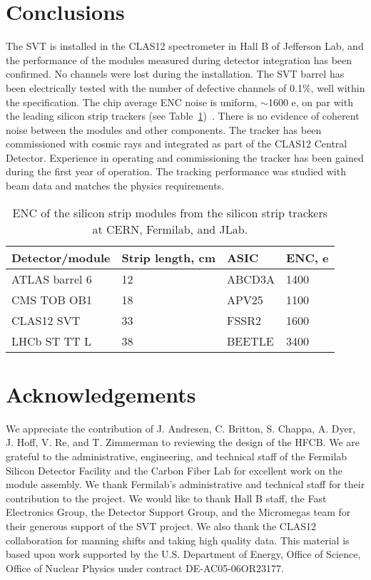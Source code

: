 \section{Conclusions}

The SVT is installed in the CLAS12 spectrometer in Hall B of Jefferson Lab, and the performance of the modules measured during detector integration has been confirmed. No channels were lost during the installation. The SVT barrel has been electrically  tested with the number of defective channels of 0.1$\%$, well within the specification. The chip average ENC noise is uniform, $\sim$1600 e, on par with the leading silicon strip trackers (see Table~\ref{tab:enc-table})~\cite{CMSCOSMICNOTE, ATLASSCT, LHCBTT}. There is no evidence of coherent noise between the modules and other components. The tracker has been commissioned with cosmic rays and integrated as part of the CLAS12 Central Detector. Experience in operating and commissioning the tracker has been gained during the first year of operation. The tracking performance was studied with beam data and matches the physics requirements. 

\begin{table}[hbt]
\begin{tabular}{llll}
\hline
Detector/module      & Strip length, cm & ASIC & ENC, e\\ \hline
ATLAS barrel 6        & 12  & ABCD3A    & 1400  \\
CMS TOB OB1        & 18  & APV25       & 1100  \\
CLAS12 SVT           & 33  & FSSR2       & 1600 \\
LHCb ST TT L         & 38  & BEETLE     & 3400  \\ \hline
\end{tabular}
\caption{ENC of the silicon strip modules from the silicon strip trackers at CERN, Fermilab, and JLab.}
\label{tab:enc-table}
\end{table}

\section{Acknowledgements}

We appreciate the contribution of J.  Andresen, C. Britton, S. Chappa, A. Dyer, J. Hoff, V. Re, and T. Zimmerman to reviewing the design of the HFCB. We are grateful to the administrative, engineering, and technical staff of the Fermilab Silicon Detector Facility and the Carbon Fiber Lab for excellent work on the module assembly. We thank Fermilab's administrative and technical staff for their contribution to the project. We would like to thank Hall B staff, the Fast Electronics Group, the Detector Support Group, and the Micromegas team for their generous support of the SVT project. We  also  thank the CLAS12 collaboration for manning shifts and taking high quality data. This material is based upon work supported by the U.S. Department of Energy, Office of Science, Office of Nuclear Physics under contract DE-AC05-06OR23177.



